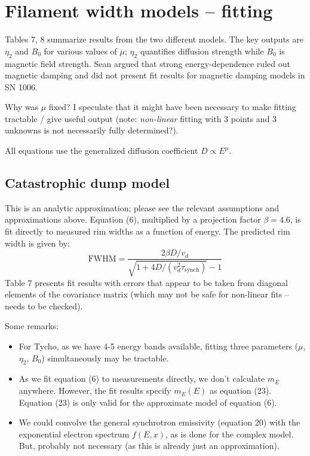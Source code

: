 \documentclass[10pt]{article}
\newcommand{\mt}{\mathrm}
\begin{document}
\section{Filament width models -- fitting}

Tables 7, 8 summarize results from the two different models.  The key outputs
are $\eta_2$ and $B_0$ for various values of $\mu$; $\eta_2$ quantifies
diffusion strength while $B_0$ is magnetic field strength.
Sean argued that strong energy-dependence ruled out magnetic damping and did
not present fit results for magnetic damping models in SN 1006.

Why was $\mu$ fixed?  I speculate that it might have been necessary to make
fitting tractable / give useful output (note: \emph{non-linear} fitting with
3 points and 3 unknowns is not necessarily fully determined?).

All equations use the generalized diffusion coefficient $D \propto E^\mu$.

\subsection{Catastrophic dump model}

This is an analytic approximation; please see the relevant assumptions and
approximations above.  Equation (6), multiplied by a projection factor
$\beta=4.6$, is fit directly to measured rim widths as a function of energy.
The predicted rim width is given by:
\[
  \mt{FWHM} = \frac{2\beta D / v_d}
              {\sqrt{1 + 4D/\left(v_d^2 \tau_{\mt{synch}}\right) } - 1}
\]
Table 7 presents fit results with errors that appear to be taken
from diagonal elements of the covariance matrix (which may not be safe for
non-linear fits -- needs to be checked).

Some remarks:
\begin{itemize}
  \item For Tycho, as we have 4-5 energy bands available, fitting three
  parameters ($\mu$, $\eta_2$, $B_0$) simultaneously may be tractable.
  \item As we fit equation (6) to measurements directly, we don't calculate
  $m_E$ anywhere.  However, the fit results specify $m_E(E)$ as equation (23).
  Equation (23) is only valid for the approximate model of equation (6).
  \item We could convolve the general synchrotron emissivity (equation 20) with
  the exponential electron spectrum $f(E,x)$, as is done for the complex model.
  But, probably not necessary (as this is already just an approximation).
\end{itemize}
\end{document}
